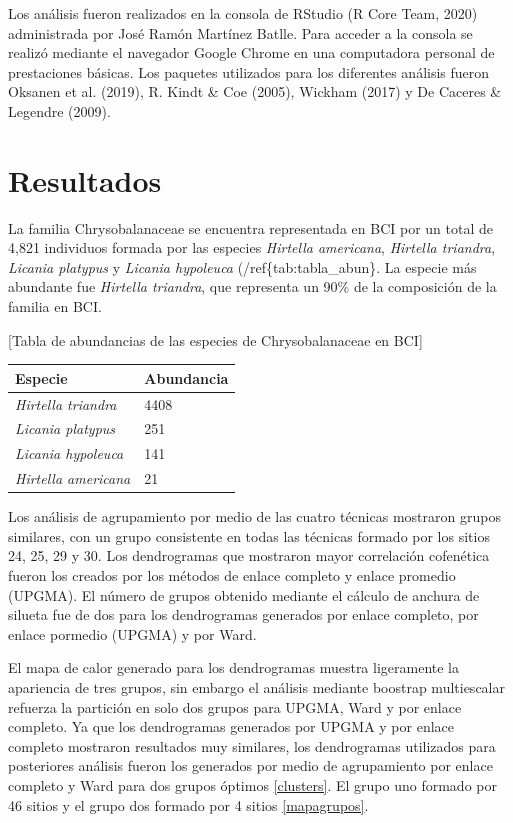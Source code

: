 \documentclass[11pt,]{article}
\begin{document}
Los análisis fueron realizados en la consola de RStudio (R Core Team,
2020) administrada por José Ramón Martínez Batlle. Para acceder a la
consola se realizó mediante el navegador Google Chrome en una
computadora personal de prestaciones básicas. Los paquetes utilizados
para los diferentes análisis fueron Oksanen et al. (2019), R. Kindt \&
Coe (2005), Wickham (2017) y De Caceres \& Legendre (2009).

\section{Resultados}\label{resultados}

La familia Chrysobalanaceae se encuentra representada en BCI por un
total de 4,821 individuos formada por las especies \emph{Hirtella
americana}, \emph{Hirtella triandra}, \emph{Licania platypus} y
\emph{Licania hypoleuca} (/ref\{tab:tabla\_abun\}. La especie más
abundante fue \emph{Hirtella triandra}, que representa un 90\% de la
composición de la familia en BCI.

{[}Tabla de abundancias de las especies de Chrysobalanaceae en
BCI\label{tab:tabla_abun}{]}

\begin{longtable}[]{@{}ll@{}}
\toprule
Especie & Abundancia\tabularnewline
\midrule
\endhead
\emph{Hirtella triandra} & 4408\tabularnewline
\emph{Licania platypus} & 251\tabularnewline
\emph{Licania hypoleuca} & 141\tabularnewline
\emph{Hirtella americana} & 21\tabularnewline
\bottomrule
\end{longtable}

Los análisis de agrupamiento por medio de las cuatro técnicas mostraron
grupos similares, con un grupo consistente en todas las técnicas formado
por los sitios 24, 25, 29 y 30. Los dendrogramas que mostraron mayor
correlación cofenética fueron los creados por los métodos de enlace
completo y enlace promedio (UPGMA). El número de grupos obtenido
mediante el cálculo de anchura de silueta fue de dos para los
dendrogramas generados por enlace completo, por enlace pormedio (UPGMA)
y por Ward.

El mapa de calor generado para los dendrogramas muestra ligeramente la
apariencia de tres grupos, sin embargo el análisis mediante boostrap
multiescalar refuerza la partición en solo dos grupos para UPGMA, Ward y
por enlace completo. Ya que los dendrogramas generados por UPGMA y por
enlace completo mostraron resultados muy similares, los dendrogramas
utilizados para posteriores análisis fueron los generados por medio de
agrupamiento por enlace completo y Ward para dos grupos óptimos
\ref{clusters}. El grupo uno formado por 46 sitios y el grupo dos
formado por 4 sitios \ref{mapagrupos}.
\end{document}
